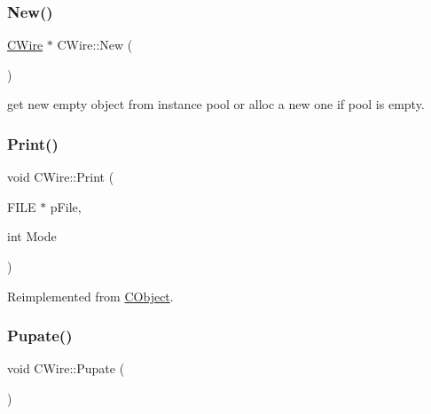 \mbox{\label{classCWire_ad3c0d423ef6dc81227d3e16803b1cf17}} 
\subsubsection{\texorpdfstring{New()}{New()}}
{\footnotesize\ttfamily \mbox{\hyperlink{classCWire}{C\+Wire}} $\ast$ C\+Wire\+::\+New (\begin{DoxyParamCaption}{ }\end{DoxyParamCaption})\hspace{0.3cm}{\ttfamily [static]}}

get new empty object from instance pool or alloc a new one if pool is empty. \mbox{\label{classCWire_a76b2e23a425ddd51f02f41ba2caf3134}} 
\subsubsection{\texorpdfstring{Print()}{Print()}}
{\footnotesize\ttfamily void C\+Wire\+::\+Print (\begin{DoxyParamCaption}\item[{F\+I\+LE $\ast$}]{p\+File,  }\item[{int}]{Mode }\end{DoxyParamCaption})\hspace{0.3cm}{\ttfamily [virtual]}}



Reimplemented from \mbox{\hyperlink{classCObject_a75afd905b2d14ed374c75d90f079a389}{C\+Object}}.

\mbox{\label{classCWire_afc0e5cf89e354b121793c11ac460aa52}} 
\subsubsection{\texorpdfstring{Pupate()}{Pupate()}}
{\footnotesize\ttfamily void C\+Wire\+::\+Pupate (\begin{DoxyParamCaption}{ }\end{DoxyParamCaption})}

\mbox{\label{classCWire_a5eecb0e93a2609930901b265ed4fc3de}} 
